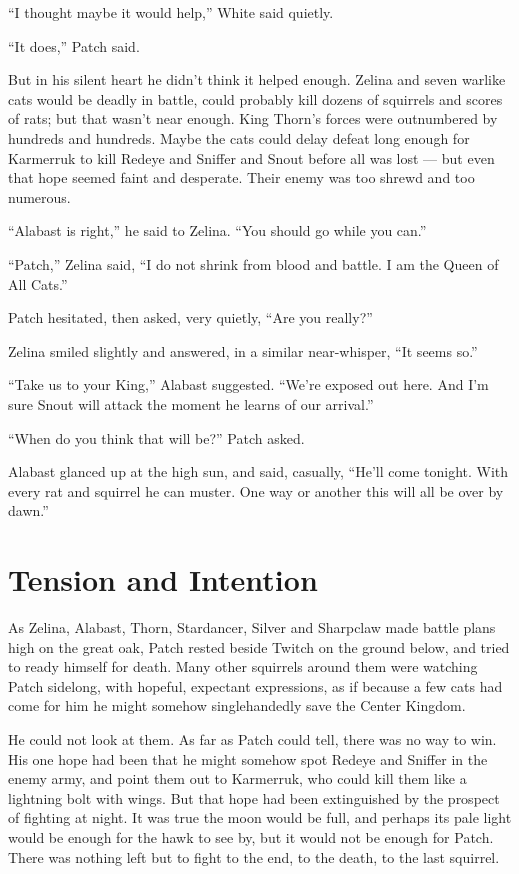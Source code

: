 \documentclass[ebook,oneside,openany,17pt]{memoir}
\renewcommand{\thechapter}{\Roman{chapter}}
\newcounter{sections}
\newcommand{\sections}[1]{%
  \section*{#1}
  \addtocounter{sections}{1}%
  \pdfbookmark[1]{#1}{section.\thechapter.\thesections}}
\begin{document}
“I thought maybe it would help,” White said quietly.

“It does,” Patch said.

But in his silent heart he didn’t think it helped enough. Zelina and
seven warlike cats would be deadly in battle, could probably kill
dozens of squirrels and scores of rats; but that wasn’t near
enough. King Thorn’s forces were outnumbered by hundreds and
hundreds. Maybe the cats could delay defeat long enough for Karmerruk
to kill Redeye and Sniffer and Snout before all was lost — but even
that hope seemed faint and desperate. Their enemy was too shrewd and
too numerous.

“Alabast is right,” he said to Zelina. “You should go while you can.”

“Patch,” Zelina said, “I do not shrink from blood and battle. I am the
Queen of All Cats.”

Patch hesitated, then asked, very quietly, “Are you really?”

Zelina smiled slightly and answered, in a similar near-whisper, “It
seems so.”

“Take us to your King,” Alabast suggested. “We’re exposed out
here. And I’m sure Snout will attack the moment he learns of our
arrival.”

“When do you think that will be?” Patch asked.

Alabast glanced up at the high sun, and said, casually, “He’ll come
tonight. With every rat and squirrel he can muster. One way or another
this will all be over by dawn.”


\sections{Tension and Intention}

As Zelina, Alabast, Thorn, Stardancer, Silver and Sharpclaw made
battle plans high on the great oak, Patch rested beside Twitch on the
ground below, and tried to ready himself for death. Many other
squirrels around them were watching Patch sidelong, with hopeful,
expectant expressions, as if because a few cats had come for him he
might somehow singlehandedly save the Center Kingdom.

He could not look at them. As far as Patch could tell, there was no
way to win. His one hope had been that he might somehow spot Redeye
and Sniffer in the enemy army, and point them out to Karmerruk, who
could kill them like a lightning bolt with wings. But that hope had
been extinguished by the prospect of fighting at night. It was true
the moon would be full, and perhaps its pale light would be enough for
the hawk to see by, but it would not be enough for Patch. There was
nothing left but to fight to the end, to the death, to the last
squirrel.
\end{document}
